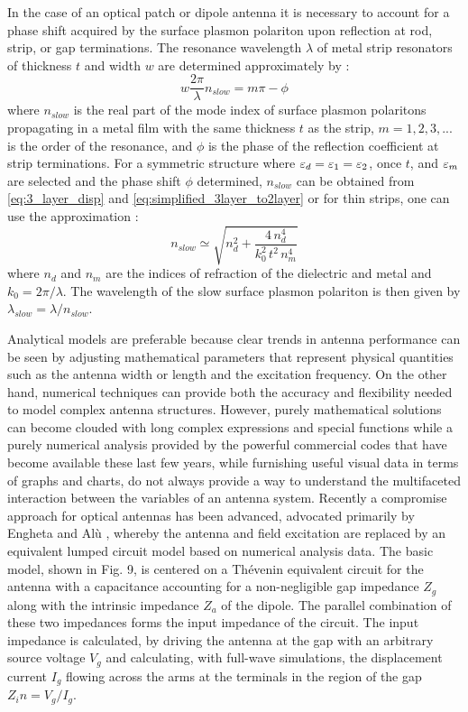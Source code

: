 \documentclass[11pt]{article}
\begin{document}
In the case of an optical patch or dipole antenna it is necessary to account for a phase shift acquired by the surface plasmon polariton upon reflection at rod, strip, or gap terminations. The resonance wavelength $\lambda$ of metal strip resonators of thickness $t$ and width $w$ are determined approximately by \cite{Sondergaard2007}:
%
\begin{equation}
  w \frac{2 \pi}{\lambda} n_{slow} = m\pi  - \phi
  \label{eq:resonant_lambda}
\end{equation}
%
where $n_{slow}$ is the real part of the mode index of surface plasmon polaritons propagating in a metal film with the same thickness $t$ as the strip, $m = 1,2,3,...$ is the order of the resonance, and $\phi$ is the phase of the reflection coefficient at strip terminations. For a symmetric structure where $\varepsilon_d = \varepsilon_1 = \varepsilon_2$, once $t$, and $\varepsilon_m$ are selected and the phase shift $\phi$ determined, $n_{slow}$ can be obtained from \eqref{eq:3_layer_disp} and \eqref{eq:simplified_3layer_to2layer} or for thin strips, one can use the approximation \cite{Sondergaard2008}:
%
\begin{equation}
  n_{slow} \simeq \sqrt {n_d^2 + \frac{4 \, n_d^4}{k_0^2 \, t^2 \, n_m^4}}
  \label{eq:n_approx}
\end{equation}
%
where $n_d$ and $n_m$ are the indices of refraction of the dielectric and metal and $k_0 = 2 \pi /\lambda$. The wavelength of the slow surface plasmon polariton is then given by $\lambda_{slow} = \lambda/ n_{slow}$.

Analytical models are preferable because clear trends in antenna performance can be seen by adjusting mathematical parameters that represent physical quantities such as the antenna width or length and the excitation frequency. On the other hand, numerical techniques can provide both the accuracy and flexibility needed to model complex antenna structures. However, purely mathematical solutions can become clouded with long complex expressions and special functions while a purely numerical analysis provided by the powerful commercial codes that have become available these last few years, while furnishing useful visual data in terms of graphs and charts, do not always provide a way to understand the multifaceted interaction between the variables of an antenna system. Recently a compromise approach for optical antennas has been advanced, advocated primarily by Engheta and Alù \cite{Engheta2005,Alu2007,Zhao2011,9781107014145}, whereby the antenna and field excitation are replaced by an equivalent lumped circuit model based on numerical analysis data. The basic model, shown in Fig. 9, is centered on a Thévenin equivalent circuit for the antenna with a capacitance accounting for a non-negligible gap
impedance $Z_g$ along with the intrinsic impedance $Z_a$ of the dipole. The parallel combination of these two impedances forms the input impedance of the circuit. The input impedance is calculated, by driving the antenna at the gap with an arbitrary source voltage $V_g$ and calculating, with full-wave simulations, the displacement current $I_g$ flowing across the arms at the terminals in the region of the gap $Z_in = V_g / I_g$.
\end{document}
